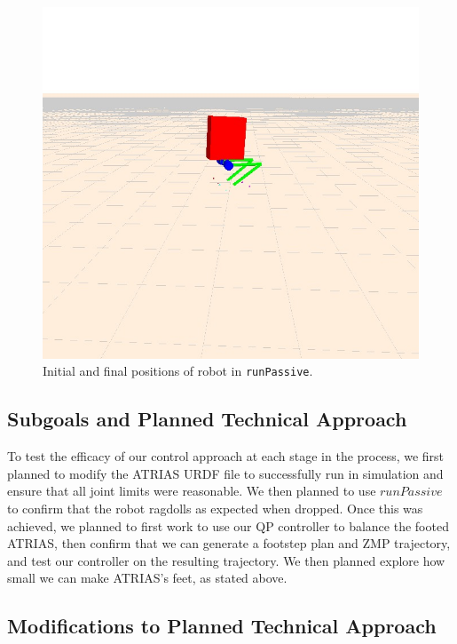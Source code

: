 \documentclass[letterpaper, 10 pt, conference]{ieeeconf}  %
\begin{document}
      \begin{figure}[thpb]
      \centering
      \includegraphics[scale=0.3]{figures/runPassiveFinal.jpg}
      \caption{Initial and final positions of robot in {\tt runPassive}.}
      \label{footstep}
   \end{figure}

\subsection{Subgoals and Planned Technical Approach}

To test the efficacy of our control approach at each stage in the process, we first planned to modify the ATRIAS URDF file to successfully run in simulation and ensure that all joint limits were reasonable. We then planned to use $runPassive$ to confirm that the robot ragdolls as expected when dropped. Once this was achieved, we planned to first work to use our QP controller to balance the footed ATRIAS, then confirm that we can generate a footstep plan and ZMP trajectory, and test our controller on the resulting trajectory. We then planned explore how small we can make ATRIAS's feet, as stated above.

\subsection{Modifications to Planned Technical Approach}
\end{document}
